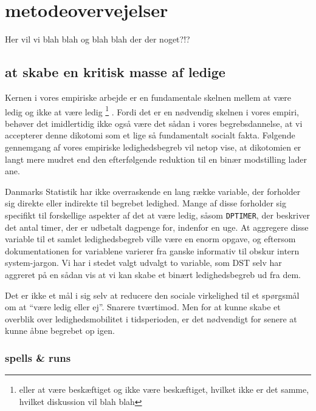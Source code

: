 





\chapter{metodeovervejelser \label{}}

Her vil vi blah blah og blah blah der der noget?!?


\section{at skabe en kritisk masse af ledige \label{ledigskab}}

Kernen i vores empiriske arbejde er en fundamentale skelnen mellem at være ledig og ikke at være ledig%
%
\footnote{eller at være beskæftiget og ikke være beskæftiget, hvilket ikke er det samme, hvilket diskussion vil blah blah}%
%
. Fordi det er en nødvendig skelnen i vores empiri, behøver det imidlertidig ikke også være det sådan i vores begrebsdannelse, at vi accepterer denne dikotomi som et lige så fundamentalt socialt fakta. Følgende gennemgang af vores empiriske ledighedsbegreb vil netop vise, at dikotomien er langt mere mudret end den efterfølgende reduktion til en binær modstilling lader ane. 

Danmarks Statistik har ikke overraskende en lang række variable, der forholder sig direkte eller indirekte til begrebet ledighed. Mange af disse forholder sig specifikt til forskellige aspekter af det at være ledig, såsom \texttt{DPTIMER}, der beskriver det antal timer, der er udbetalt dagpenge for, indenfor en uge. At aggregere disse variable til et samlet ledighedsbegreb ville være en enorm opgave, og eftersom dokumentationen for variablene varierer fra ganske informativ til obskur intern system-jargon. Vi har i stedet valgt udvalgt to variable, som DST selv har aggreret på en sådan vis at vi kan skabe et binært ledighedsbegreb ud fra dem. 

Det er ikke et mål i sig selv at reducere den sociale virkelighed til et spørgsmål om at “være ledig eller ej”. Snarere tværtimod. Men for at kunne skabe et overblik over ledighedsmobilitet i tidsperioden, er det nødvendigt for senere at kunne åbne begrebet op igen.  

\subsection{spells \& runs}

